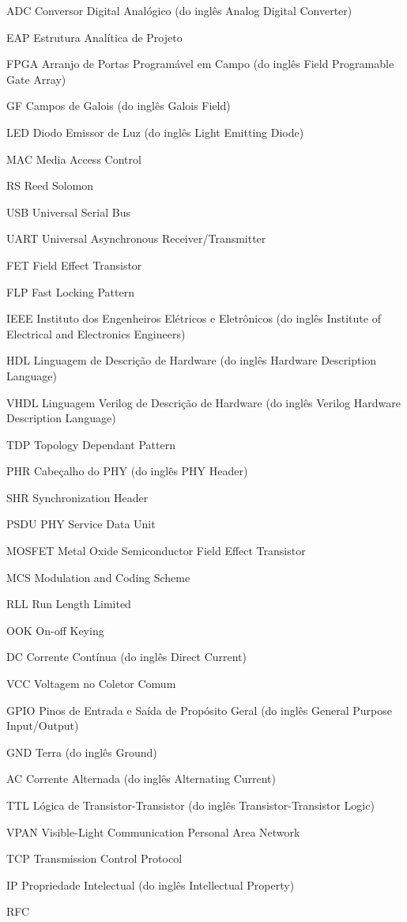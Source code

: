 \documentclass[
	12pt,				%
	openright,			%
	twoside,			%
	a4paper,			%
	hyphens,			%
	english,			%
	brazil				%
]{abntex2}
\begin{document}
	\begin{siglas}
		\item[ADC] Conversor Digital Analógico (do inglês Analog Digital Converter)
		\item[EAP] Estrutura Analítica de Projeto
		\item[FPGA] Arranjo de Portas Programável em Campo (do inglês Field Programable Gate Array)
		\item[GF] Campos de Galois (do inglês Galois Field)
		\item[LED] Diodo Emissor de Luz (do inglês Light Emitting Diode)
		\item[MAC] Media Access Control
		\item[RS] Reed Solomon
		\item[USB] Universal Serial Bus
		\item[UART] Universal Asynchronous Receiver/Transmitter
		\item[FET] Field Effect Transistor
		\item[FLP] Fast Locking Pattern
		\item[IEEE] Instituto dos Engenheiros Elétricos e Eletrônicos (do inglês Institute of Electrical and Electronics Engineers)
		\item[HDL] Linguagem de Descrição de Hardware (do inglês Hardware Description Language)
		\item[VHDL] Linguagem Verilog de Descrição de Hardware (do inglês Verilog Hardware Description Language)
		\item[TDP] Topology Dependant Pattern
		\item[PHR] Cabeçalho do PHY (do inglês PHY Header)
		\item[SHR] Synchronization Header
		\item[PSDU] PHY Service Data Unit
		\item[MOSFET] Metal Oxide Semiconductor Field Effect Transistor
		\item[MCS] Modulation and Coding Scheme
		\item[RLL] Run Length Limited
		\item[OOK] On-off Keying
		\item[DC] Corrente Contínua (do inglês Direct Current)
		\item[VCC] Voltagem no Coletor Comum
		\item[GPIO] Pinos de Entrada e Saída de Propósito Geral (do inglês General Purpose Input/Output)
		\item[GND] Terra (do inglês Ground)
		\item[AC] Corrente Alternada (do inglês Alternating Current)
		\item[TTL] Lógica de Transistor-Transistor (do inglês Transistor-Transistor Logic)
		\item[VPAN] Visible-Light Communication Personal Area Network
		\item[TCP] Transmission Control Protocol
		\item[IP] Propriedade Intelectual (do inglês Intellectual Property)
		\item[RFC] 
	\end{siglas}
	
\end{document}
